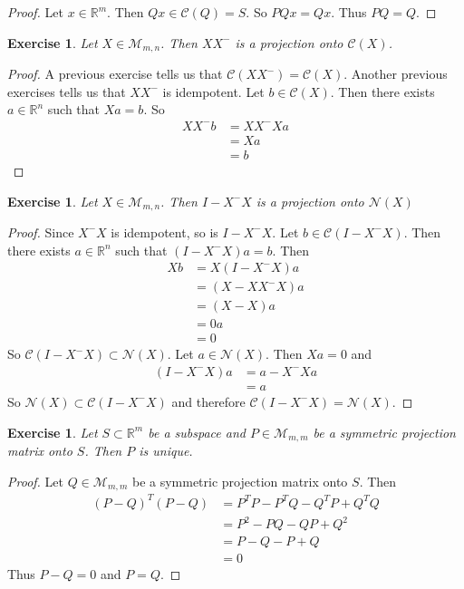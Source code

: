 \documentclass[12pt]{amsart}
\newtheorem{ex}[thm]{Exercise}
\newcommand{\R}{\mathbb{R}}
\newcommand{\MC}{\mathcal{C}}
\newcommand{\MN}{\mathcal{N}}
\newcommand{\MM}{\mathcal{M}}
\newcommand{\z}[1]{Let ${#1} \in \MM_{m,n}$}
\begin{document}
\begin{proof}
Let $x \in \R^m$. Then $Qx \in \MC(Q) = S$. So $PQx = Qx$. Thus $PQ = Q$.
\end{proof}

\begin{ex}
\z{X}. Then $XX^-$ is a projection onto $\MC(X)$.
\end{ex}

\begin{proof}
A previous exercise tells us that $\MC(XX^-) = \MC(X)$. Another previous exercises tells us that $XX^-$ is idempotent. Let $b \in \MC(X)$. Then there exists $a \in \R^n$ such that $Xa =b$. So 
\begin{align*}
XX^-b
&= XX^- Xa\\ 
&= Xa\\
&= b
\end{align*}
\end{proof}

\begin{ex}
\z{X}. Then $I-X^-X$ is a projection onto $\MN(X)$
\end{ex}

\begin{proof}
Since $X^-X$ is idempotent, so is $I-X^-X$. Let $b \in \MC(I-X^-X)$. Then there exists $a \in \R^n$ such that $(I-X^-X)a = b$. Then 
\begin{align*}
Xb 
&= X(I-X^-X)a \\
&= (X-XX^-X)a \\
&= (X-X)a \\
&= 0a \\ 
&= 0
\end{align*}
So $\MC(I-X^-X) \subset \MN(X)$. Let $a \in \MN(X)$. Then $Xa =0$ and 
\begin{align*}
(I-X^-X)a 
&= a - X^-Xa \\
&= a
\end{align*} 
So $\MN(X) \subset \MC(I-X^-X)$ and therefore $ \MC(I-X^-X) = \MN(X) $.
\end{proof}

\begin{ex}
Let $S \subset \R^m$ be a subspace and $P \in \MM_{m,m}$ be a symmetric projection matrix onto $S$. Then $P$ is unique. 
\end{ex}

\begin{proof}
Let $Q \in \MM_{m,m}$ be a symmetric projection matrix onto $S$. Then 
\begin{align*}
(P-Q)^T(P-Q) 
&= P^TP - P^TQ - Q^TP + Q^TQ \\
&= P^2 - PQ - QP +Q^2 \\
&= P - Q - P + Q \\
&= 0
\end{align*}
Thus $P-Q = 0$ and $P =Q$.
\end{proof}
\end{document}
